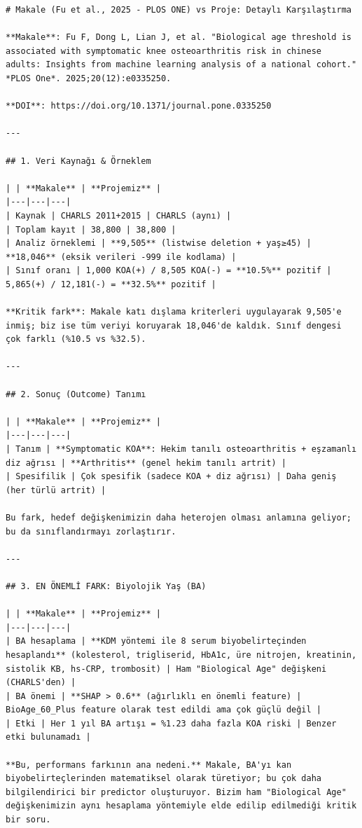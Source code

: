 ﻿\documentclass[11pt,a4paper]{article}
\begin{document}
\begin{verbatim}
# Makale (Fu et al., 2025 - PLOS ONE) vs Proje: Detaylı Karşılaştırma

**Makale**: Fu F, Dong L, Lian J, et al. "Biological age threshold is associated with symptomatic knee osteoarthritis risk in chinese adults: Insights from machine learning analysis of a national cohort." *PLOS One*. 2025;20(12):e0335250.

**DOI**: https://doi.org/10.1371/journal.pone.0335250

---

## 1. Veri Kaynağı & Örneklem

| | **Makale** | **Projemiz** |
|---|---|---|
| Kaynak | CHARLS 2011+2015 | CHARLS (aynı) |
| Toplam kayıt | 38,800 | 38,800 |
| Analiz örneklemi | **9,505** (listwise deletion + yaş≥45) | **18,046** (eksik verileri -999 ile kodlama) |
| Sınıf oranı | 1,000 KOA(+) / 8,505 KOA(-) = **10.5%** pozitif | 5,865(+) / 12,181(-) = **32.5%** pozitif |

**Kritik fark**: Makale katı dışlama kriterleri uygulayarak 9,505'e inmiş; biz ise tüm veriyi koruyarak 18,046'de kaldık. Sınıf dengesi çok farklı (%10.5 vs %32.5).

---

## 2. Sonuç (Outcome) Tanımı

| | **Makale** | **Projemiz** |
|---|---|---|
| Tanım | **Symptomatic KOA**: Hekim tanılı osteoarthritis + eşzamanlı diz ağrısı | **Arthritis** (genel hekim tanılı artrit) |
| Spesifilik | Çok spesifik (sadece KOA + diz ağrısı) | Daha geniş (her türlü artrit) |

Bu fark, hedef değişkenimizin daha heterojen olması anlamına geliyor; bu da sınıflandırmayı zorlaştırır.

---

## 3. EN ÖNEMLİ FARK: Biyolojik Yaş (BA)

| | **Makale** | **Projemiz** |
|---|---|---|
| BA hesaplama | **KDM yöntemi ile 8 serum biyobelirteçinden hesaplandı** (kolesterol, trigliserid, HbA1c, üre nitrojen, kreatinin, sistolik KB, hs-CRP, trombosit) | Ham "Biological Age" değişkeni (CHARLS'den) |
| BA önemi | **SHAP > 0.6** (ağırlıklı en önemli feature) | BioAge_60_Plus feature olarak test edildi ama çok güçlü değil |
| Etki | Her 1 yıl BA artışı = %1.23 daha fazla KOA riski | Benzer etki bulunamadı |

**Bu, performans farkının ana nedeni.** Makale, BA'yı kan biyobelirteçlerinden matematiksel olarak türetiyor; bu çok daha bilgilendirici bir predictor oluşturuyor. Bizim ham "Biological Age" değişkenimizin aynı hesaplama yöntemiyle elde edilip edilmediği kritik bir soru.


\end{verbatim}
\end{document}
